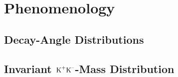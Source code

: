 \chapter{Phenomenology}
\label{chap:pheno}





\section{Decay-Angle Distributions}
\label{sec:pheno_angles}

\section{Invariant \texorpdfstring{$\text{K}^\text{+}\text{K}^\text{--}$}{KK}-Mass Distribution}
\label{sec:pheno_KKMass}


